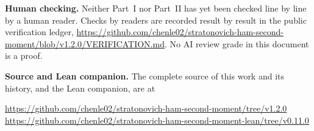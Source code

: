 \documentclass[12pt,oneside,openany]{book}
\numberwithin{equation}{section}
\theoremstyle{nogostyle}
\theoremstyle{definition}
\begin{document}
\medskip
\noindent\textbf{Human checking.} Neither Part~I nor Part~II has yet been
checked line by line by a human reader. Checks by readers are recorded result
by result in the public verification ledger,
\url{https://github.com/chenle02/stratonovich-ham-second-moment/blob/v1.2.0/VERIFICATION.md}.
No AI review grade in this document is a proof.

\medskip
\noindent\textbf{Source and Lean companion.} The complete source of this work
and its history, and the Lean companion, are at
\begin{center}\small
\url{https://github.com/chenle02/stratonovich-ham-second-moment/tree/v1.2.0}\\
\url{https://github.com/chenle02/stratonovich-ham-second-moment-lean/tree/v0.11.0}
\end{center}
\clearpage
\hypersetup{pageanchor=true}


\end{document}
